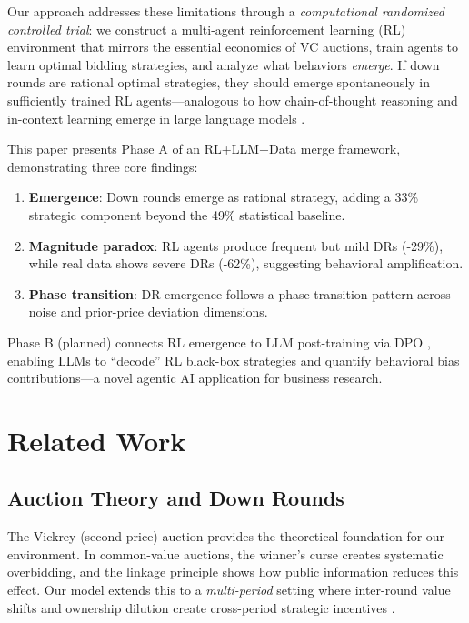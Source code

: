 \documentclass[11pt,a4paper]{article}
\begin{document}
Our approach addresses these limitations through a \emph{computational randomized controlled trial}: we construct a multi-agent reinforcement learning (RL) environment that mirrors the essential economics of VC auctions, train agents to learn optimal bidding strategies, and analyze what behaviors \emph{emerge}. If down rounds are rational optimal strategies, they should emerge spontaneously in sufficiently trained RL agents---analogous to how chain-of-thought reasoning and in-context learning emerge in large language models \citep{brown2020,wei2022}.

This paper presents Phase A of an RL+LLM+Data merge framework, demonstrating three core findings:
\begin{enumerate}[nosep]
  \item \textbf{Emergence}: Down rounds emerge as rational strategy, adding a 33\% strategic component beyond the 49\% statistical baseline.
  \item \textbf{Magnitude paradox}: RL agents produce frequent but mild DRs (-29\%), while real data shows severe DRs (-62\%), suggesting behavioral amplification.
  \item \textbf{Phase transition}: DR emergence follows a phase-transition pattern across noise and prior-price deviation dimensions.
\end{enumerate}

Phase B (planned) connects RL emergence to LLM post-training via DPO \citep{rafailov2023}, enabling LLMs to ``decode'' RL black-box strategies and quantify behavioral bias contributions---a novel agentic AI application for business research.

\section{Related Work}

\subsection{Auction Theory and Down Rounds}

The Vickrey (second-price) auction \citep{vickrey1961} provides the theoretical foundation for our environment. In common-value auctions, the winner's curse \citep{thaler1988} creates systematic overbidding, and the linkage principle \citep{milgrom1982} shows how public information reduces this effect. Our model extends this to a \emph{multi-period} setting where inter-round value shifts and ownership dilution create cross-period strategic incentives \citep{gompers1998}.
\end{document}
